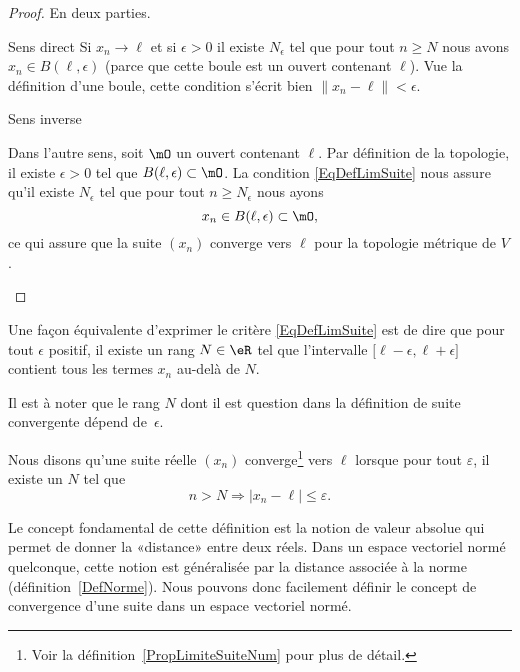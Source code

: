 \begin{proof}
    En deux parties.
    \begin{subproof}
        \item[Sens direct]
            Si \( x_n\to \ell\) et si \( \epsilon>0\) il existe \( N_{\epsilon}\) tel que pour tout \( n\geq N\) nous avons \( x_n\in B(\ell,\epsilon)\) (parce que cette boule est un ouvert contenant \( \ell\)). Vue la définition d'une boule, cette condition s'écrit bien \( \| x_n-\ell \|<\epsilon\).

        \item[Sens inverse]

            Dans l'autre sens, soit \( \mO\) un ouvert contenant \( \ell\). Par définition de la topologie, il existe \( \epsilon>0\) tel que \( B(\ell,\epsilon)\subset \mO\). La condition \eqref{EqDefLimSuite} nous assure qu'il existe \( N_{\epsilon} \) tel que pour tout \( n\geq N_{\epsilon}\) nous ayons
            \begin{equation}
             x_n\in B(\ell,\epsilon)\subset\mO,
             \end{equation}
            ce qui assure que la suite \( (x_n)\) converge vers \( \ell\) pour la topologie métrique de \( V\).
    \end{subproof}
\end{proof}

Une façon équivalente d'exprimer le critère \eqref{EqDefLimSuite} est de dire que pour tout $\epsilon$ positif, il existe un rang $N\in\eR$ tel que l'intervalle $\mathopen[ \ell-\epsilon , \ell+\epsilon \mathclose]$ contient tous les termes $x_n$ au-delà de $N$.

Il est à noter que le rang $N$ dont il est question dans la définition de suite convergente dépend de~$\epsilon$.

\begin{definition}      \label{DEFooHNCTooMlQUvx}
    Nous disons qu'une suite réelle $(x_n)$ converge\footnote{Voir la définition~\ref{PropLimiteSuiteNum} pour plus de détail.} vers $\ell$ lorsque pour tout $\varepsilon$, il existe un $N$ tel que
    \begin{equation}
        n>N\Rightarrow | x_n-\ell |\leq\varepsilon.
    \end{equation}
\end{definition}

Le concept fondamental de cette définition est la notion de valeur absolue qui permet de donner la «distance» entre deux réels. Dans un espace vectoriel normé quelconque, cette notion est généralisée par la distance associée à la norme (définition~\ref{DefNorme}). Nous pouvons donc facilement définir le concept de convergence d'une suite dans un espace vectoriel normé.

